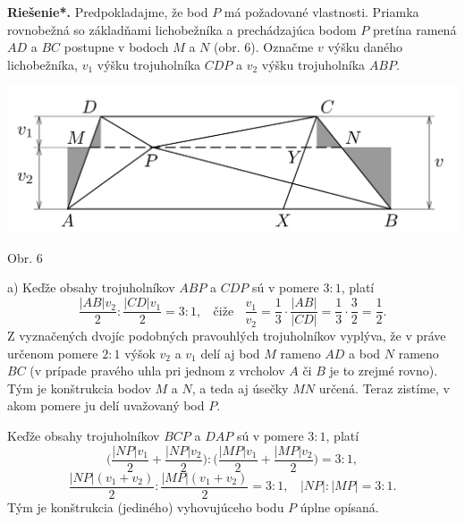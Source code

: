 \documentclass[11pt,a4paper,oneside,final]{book}
\newcommand{\rieh}{\textbf{Riešenie*.} }
\begin{document}
\rieh Predpokladajme, že bod $P$ má požadované vlastnosti. Priamka rovnobežná so základňami lichobežníka a prechádzajúca bodom $P$ pretína ramená $AD$ a $BC$ postupne v bodoch $M$ a $N$ (obr. 6). Označme $v$ výšku daného lichobežníka, $v_1$ výšku trojuholníka $CDP$ a $v_2$ výšku trojuholníka $ABP$.
\begin{center}
\includegraphics[scale=0.3]{64K3}

Obr. 6
\end{center}
a) Keďže obsahy trojuholníkov $ABP$ a $CDP$ sú v pomere $3 : 1$, platí
$$\frac{|AB|v_2}{2}:\frac{|CD|v_1}{2}= 3 : 1, \ \ \ \ \text{čiže} \ \ \ \ \frac{v_1}{v_2}=\frac{1}{3}\cdot \frac{|AB|}{|CD|}=\frac{1}{3}\cdot \frac{3}{2}=\frac{1}{2}.$$
Z vyznačených dvojíc podobných pravouhlých trojuholníkov vyplýva, že v práve určenom pomere $2 : 1$ výšok $v_2$ a $v_1$ delí aj bod $M$ rameno $AD$ a bod $N$ rameno $BC$ (v prípade pravého uhla pri jednom z vrcholov $A$ či $B$ je to zrejmé rovno). Tým je konštrukcia bodov $M$ a $N$, a teda aj úsečky $MN$ určená. Teraz zistíme, v akom pomere ju delí uvažovaný bod $P$.

Keďže obsahy trojuholníkov $BCP$ a $DAP$ sú v pomere $3 : 1$, platí
$$ \bigg(\frac{|NP|v_1}{2}+\frac{|NP|v_2}{2}\bigg): \bigg(\frac{|MP|v_1}{2}+\frac{|MP|v_2}{2}\bigg)= 3 : 1,$$
$$ \frac{|NP|(v_1 + v_2 )}{2}: \frac{|MP|(v_1 + v_2 )}{2}= 3 : 1, \ \ \ \  |NP| : |MP| = 3 : 1.$$
Tým je konštrukcia (jediného) vyhovujúceho bodu $P$ úplne opísaná.
\end{document}
